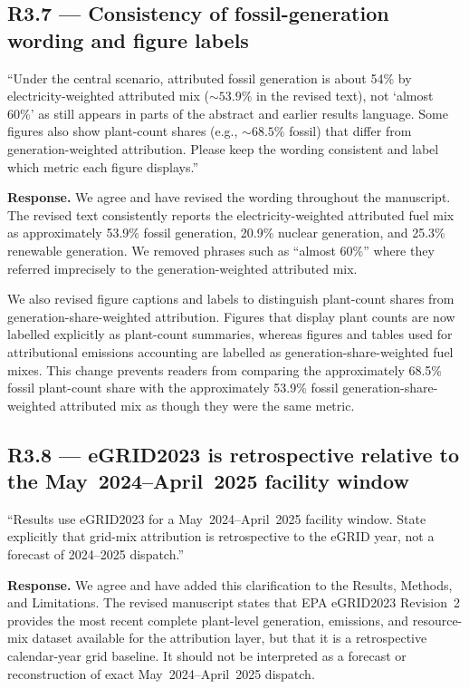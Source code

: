 \documentclass[11pt]{article}
\newenvironment{revquote}{%
  \begin{mdframed}[
    leftmargin=0.5em,
    rightmargin=0.5em,
    linewidth=0pt,
    backgroundcolor=gray!8,
    skipabove=0.5em,
    skipbelow=0.5em,
    innertopmargin=0.6em,
    innerbottommargin=0.6em,
    innerleftmargin=0.8em,
    innerrightmargin=0.8em
  ]%
  \itshape%
}{%
  \end{mdframed}%
}
\begin{document}
\subsection*{R3.7 --- Consistency of fossil-generation wording and figure labels}

\begin{revquote}
``Under the central scenario, attributed fossil generation is about 54\% by electricity-weighted attributed mix ($\sim 53.9\%$ in the revised text), not `almost 60\%' as still appears in parts of the abstract and earlier results language. Some figures also show plant-count shares (e.g., $\sim 68.5\%$ fossil) that differ from generation-weighted attribution. Please keep the wording consistent and label which metric each figure displays.''
\end{revquote}

\textbf{Response.} We agree and have revised the wording throughout the manuscript. The revised text consistently reports the electricity-weighted attributed fuel mix as approximately 53.9\% fossil generation, 20.9\% nuclear generation, and 25.3\% renewable generation. We removed phrases such as ``almost 60\%'' where they referred imprecisely to the generation-weighted attributed mix.

We also revised figure captions and labels to distinguish plant-count shares from generation-share-weighted attribution. Figures that display plant counts are now labelled explicitly as plant-count summaries, whereas figures and tables used for attributional emissions accounting are labelled as generation-share-weighted fuel mixes. This change prevents readers from comparing the approximately 68.5\% fossil plant-count share with the approximately 53.9\% fossil generation-share-weighted attributed mix as though they were the same metric.

\subsection*{R3.8 --- eGRID2023 is retrospective relative to the May~2024--April~2025 facility window}

\begin{revquote}
``Results use eGRID2023 for a May~2024--April~2025 facility window. State explicitly that grid-mix attribution is retrospective to the eGRID year, not a forecast of 2024--2025 dispatch.''
\end{revquote}

\textbf{Response.} We agree and have added this clarification to the Results, Methods, and Limitations. The revised manuscript states that EPA eGRID2023 Revision~2 provides the most recent complete plant-level generation, emissions, and resource-mix dataset available for the attribution layer, but that it is a retrospective calendar-year grid baseline. It should not be interpreted as a forecast or reconstruction of exact May~2024--April~2025 dispatch.
\end{document}
